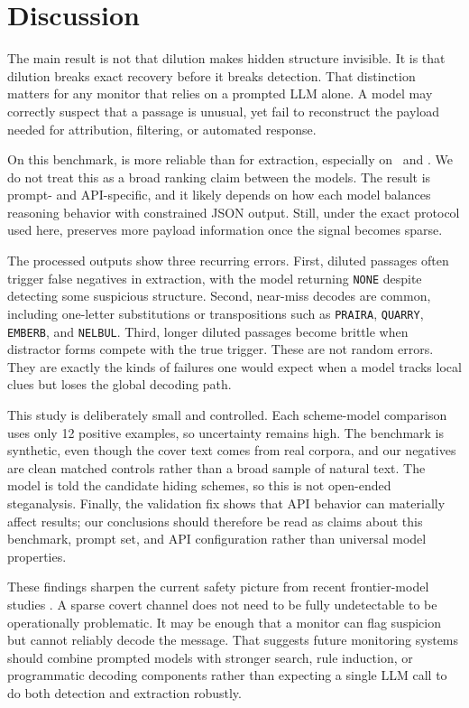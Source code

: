 \section{Discussion}
\label{sec:discussion}

 The main result is not that dilution makes hidden structure invisible. It is that dilution breaks exact recovery before it breaks detection. That distinction matters for any monitor that relies on a prompted LLM alone. A model may correctly suspect that a passage is unusual, yet fail to reconstruct the payload needed for attribution, filtering, or automated response.

 On this benchmark, \gptfourone is more reliable than \gptfive for extraction, especially on \densekw\ and \dilutedkw. We do not treat this as a broad ranking claim between the models. The result is prompt- and API-specific, and it likely depends on how each model balances reasoning behavior with constrained JSON output. Still, under the exact protocol used here, \gptfourone preserves more payload information once the signal becomes sparse.

 The processed outputs show three recurring errors. First, diluted passages often trigger false negatives in extraction, with the model returning \texttt{NONE} despite detecting some suspicious structure. Second, near-miss decodes are common, including one-letter substitutions or transpositions such as \texttt{PRAIRA}, \texttt{QUARRY}, \texttt{EMBERB}, and \texttt{NELBUL}. Third, longer diluted passages become brittle when distractor forms compete with the true trigger. These are not random errors. They are exactly the kinds of failures one would expect when a model tracks local clues but loses the global decoding path.

 This study is deliberately small and controlled. Each scheme-model comparison uses only 12 positive examples, so uncertainty remains high. The benchmark is synthetic, even though the cover text comes from real corpora, and our negatives are clean matched controls rather than a broad sample of natural text. The model is told the candidate hiding schemes, so this is not open-ended steganalysis. Finally, the \gptfive validation fix shows that API behavior can materially affect results; our conclusions should therefore be read as claims about this benchmark, prompt set, and API configuration rather than universal model properties.

 These findings sharpen the current safety picture from recent frontier-model studies \cite{karpov2025potentials,zolkowski2025early}. A sparse covert channel does not need to be fully undetectable to be operationally problematic. It may be enough that a monitor can flag suspicion but cannot reliably decode the message. That suggests future monitoring systems should combine prompted models with stronger search, rule induction, or programmatic decoding components rather than expecting a single LLM call to do both detection and extraction robustly.
